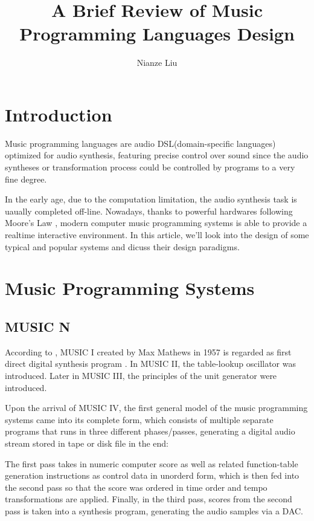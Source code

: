 \documentclass[jou]{apa6}
\title{A Brief Review of Music Programming Languages Design}
\author{Nianze Liu}
\affiliation{New York University}
\begin{document}
\maketitle

\section{Introduction}
Music programming languages are audio DSL(domain-specific languages) 
optimized for audio synthesis, featuring precise control over sound 
since the audio syntheses or transformation process could be
controlled by programs to a very fine degree.

In the early age, due to the computation limitation, the audio synthesis 
task is uaually completed off-line. Nowadays, thanks to powerful 
hardwares following Moore's Law \parencite{moore1965cramming}, modern 
computer music programming systems is able to provide a realtime 
interactive environment. In this article, we'll look into the design
of some typical and popular systems and dicuss their design paradigms.

\section{Music Programming Systems}

\subsection{MUSIC N}
According to \textcite{lazzarini2013development}, MUSIC I created by 
Max Mathews in 1957 is regarded as first direct digital synthesis 
program \parencite{mathews1963digital}. In MUSIC II, the 
table-lookup oscillator was introduced. Later in MUSIC III, the 
principles of the unit generator were introduced. 

Upon the arrival of MUSIC IV, the first general model of the music 
programming systems came into its complete form, which consists of 
multiple separate programs that 
runs in three different phases/passes, generating a digital audio
stream stored in tape or disk file in the end:

The first pass takes in numeric computer score as well as related
function-table generation instructions as control data in unorderd 
form, which is then fed into the second pass so that the score was 
ordered in time order and tempo transformations are applied. 
Finally, in the third pass, scores from the second pass is taken
into a synthesis program, generating the audio samples via a DAC.
\end{document}
